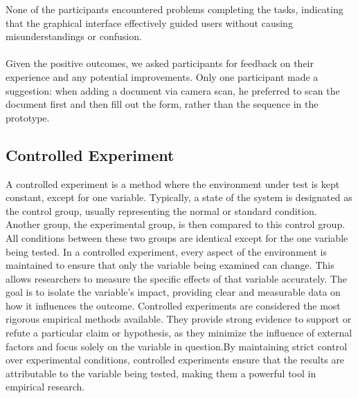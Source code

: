 	\noindent
	None of the participants encountered problems completing the tasks, indicating that the graphical interface effectively guided users without causing misunderstandings or confusion.\\\\
	Given the positive outcomes, we asked participants for feedback on their experience and any potential improvements. Only one participant made a suggestion: when adding a document via camera scan, he preferred to scan the document first and then fill out the form, rather than the sequence in the prototype.	
	
	
	
	
	
	
	
	\subsection{Controlled Experiment}
	A controlled experiment is a method where the environment under test is kept constant, except for one variable. Typically, a state of the system is designated as the control group, usually representing the normal or standard condition. Another group, the experimental group, is then compared to this control group. All conditions between these two groups are identical except for the one variable being tested.\newline
	In a controlled experiment, every aspect of the environment is maintained to ensure that only the variable being examined can change. This allows researchers to measure the specific effects of that variable accurately. The goal is to isolate the variable's impact, providing clear and measurable data on how it influences the outcome.\newline
	Controlled experiments are considered the most rigorous empirical methods available. They provide strong evidence to support or refute a particular claim or hypothesis, as they minimize the influence of external factors and focus solely on the variable in question.By maintaining strict control over experimental conditions, controlled experiments ensure that the results are attributable to the variable being tested, making them a powerful tool in empirical research.
